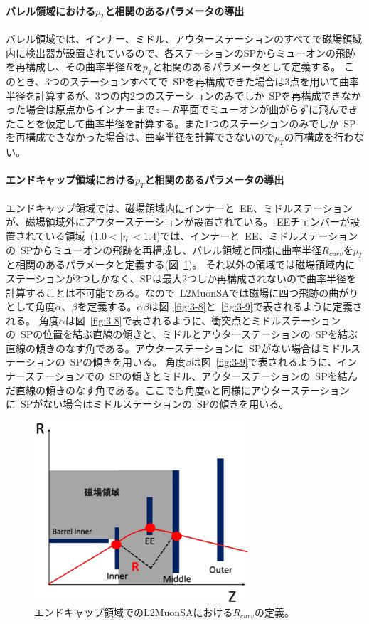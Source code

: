 \paragraph{バレル領域における$p_T$と相関のあるパラメータの導出}
バレル領域では、インナー、ミドル、アウターステーションのすべてで磁場領域内に検出器が設置されているので、各ステーションのSPからミューオンの飛跡を再構成し、その曲率半径$R$を$p_T$と相関のあるパラメータとして定義する。
このとき、3つのステーションすべてで~SPを再構成できた場合は3点を用いて曲率半径を計算するが、3つの内2つのステーションのみでしか~SPを再構成できなかった場合は原点からインナーまで$z-R$平面でミューオンが曲がらずに飛んできたことを仮定して曲率半径を計算する。また1つのステーションのみでしか~SPを再構成できなかった場合は、曲率半径を計算できないので$p_T$の再構成を行わない。


\paragraph{エンドキャップ領域における$p_T$と相関のあるパラメータの導出}
エンドキャップ領域では、磁場領域内にインナーと~EE、ミドルステーションが、磁場領域外にアウターステーションが設置されている。
EEチェンバーが設置されている領域~($1.0<|\eta|<1.4$)では、インナーと~EE、ミドルステーションの~SPからミューオンの飛跡を再構成し、バレル領域と同様に曲率半径$R_{curv}$を$p_T$と相関のあるパラメータと定義する(図~\ref{fig:3-7})。
それ以外の領域では磁場領域内にステーションが2つしかなく、SPは最大2つしか再構成されないので曲率半径を計算することは不可能である。なので~L2MuonSAでは磁場に四つ飛跡の曲がりとして角度$\alpha$、$\beta$を定義する。$\alpha$$\beta$は図~\ref{fig:3-8}と~\ref{fig:3-9}で表されるように定義される。
角度$\alpha$は図~\ref{fig:3-8}で表されるように、衝突点とミドルステーションの~SPの位置を結ぶ直線の傾きと、ミドルとアウターステーションの~SPを結ぶ直線の傾きのなす角である。アウターステーションに~SPがない場合はミドルステーションの~SPの傾きを用いる。
角度$\beta$は図~\ref{fig:3-9}で表されるように、インナーステーションでの~SPの傾きとミドル、アウターステーションの~SPを結んだ直線の傾きのなす角である。ここでも角度$\alpha$と同様にアウターステーションに~SPがない場合はミドルステーションの~SPの傾きを用いる。

\begin{figure}[h]
  \centering
  \includegraphics[clip, width=8cm]{fig/3/l2muonSA_Rcurv.png}
  \caption{エンドキャップ領域でのL2MuonSAにおける$R_{curv}$の定義\cite{article:noguchi}。}
  \label{fig:3-7}
\end{figure}

